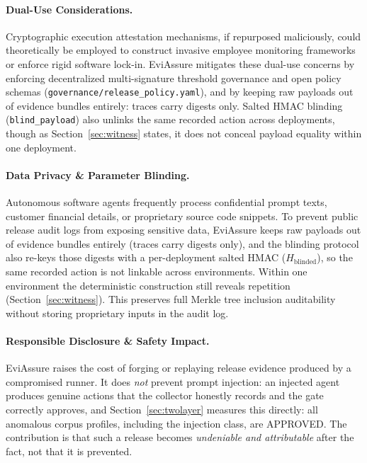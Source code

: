\documentclass[letterpaper,10pt,twocolumn]{article}
\theoremstyle{definition}
\begin{document}
\paragraph{Dual-Use Considerations.}
Cryptographic execution attestation mechanisms, if repurposed maliciously, could theoretically be employed to construct invasive employee monitoring frameworks or enforce rigid software lock-in. EviAssure mitigates these dual-use concerns by enforcing decentralized multi-signature threshold governance and open policy schemas (\nolinkurl{governance/release_policy.yaml}), and by keeping raw payloads out of evidence bundles entirely: traces carry digests only. Salted HMAC blinding (\texttt{blind\_payload}) also unlinks the same recorded action across deployments, though as Section~\ref{sec:witness} states, it does not conceal payload equality within one deployment.

\paragraph{Data Privacy \& Parameter Blinding.}
Autonomous software agents frequently process confidential prompt texts, customer financial details, or proprietary source code snippets. To prevent public release audit logs from exposing sensitive data, EviAssure keeps raw payloads out of evidence bundles entirely (traces carry digests only), and the blinding protocol also re-keys those digests with a per-deployment salted HMAC ($H_{\text{blinded}}$), so the same recorded action is not linkable across environments. Within one environment the deterministic construction still reveals repetition (Section~\ref{sec:witness}). This preserves full Merkle tree inclusion auditability without storing proprietary inputs in the audit log.

\paragraph{Responsible Disclosure \& Safety Impact.}
EviAssure raises the cost of forging or replaying release evidence produced by a compromised runner. It does \emph{not} prevent prompt injection: an injected agent produces genuine actions that the collector honestly records and the gate correctly approves, and Section~\ref{sec:twolayer} measures this directly: all \insRecallN{} anomalous corpus profiles, including the injection class, are APPROVED. The contribution is that such a release becomes \emph{undeniable and attributable} after the fact, not that it is prevented.
\end{document}
